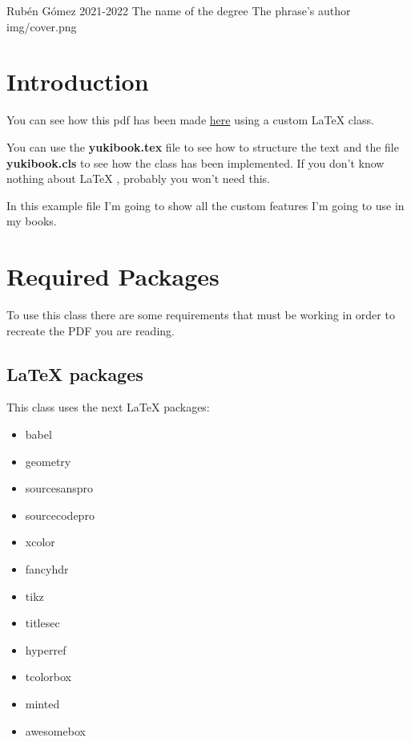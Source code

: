 \documentclass{yukibook}
\begin{document}
  {Rubén Gómez}  %
  {2021-2022}    %
  {The name \linebreak of the degree} %
  {}	%
  {The phrase's author}	%
  {img/cover.png}



\chapter{Introduction}
You can see how this pdf has been made \href{https://github.com/yuki/yukibook.cls}{here} using a custom \LaTeX{}  class.

You can use the \textbf{yukibook.tex} file to see how to structure the text and the file \textbf{yukibook.cls} to see how the class has been implemented. If you don't know nothing about \LaTeX{} , probably you won't need this.

In this example file I'm going to show all the custom features I'm going to use in my books. 

\chapter{Required Packages}
To use this class there are some requirements that must be working in order to recreate the PDF you are reading.
\section{\LaTeX{} packages}

This class uses the next \LaTeX{} packages:
\begin{itemize}
  \item babel
  \item geometry
  \item sourcesanspro
  \item sourcecodepro
  \item xcolor
  \item fancyhdr
  \item tikz
  \item titlesec
  \item hyperref
  \item tcolorbox
  \item minted 
  \item awesomebox
\end{itemize}
\end{document}
